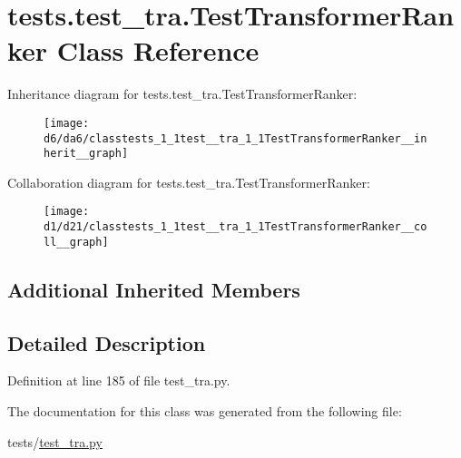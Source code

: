 \hypertarget{classtests_1_1test__tra_1_1TestTransformerRanker}{}\section{tests.\+test\+\_\+tra.\+Test\+Transformer\+Ranker Class Reference}
\label{classtests_1_1test__tra_1_1TestTransformerRanker}


Inheritance diagram for tests.\+test\+\_\+tra.\+Test\+Transformer\+Ranker\+:\nopagebreak
\begin{figure}[H]
\begin{center}
\leavevmode
\texttt{[image: d6/da6/classtests\_1\_1test\_\_tra\_1\_1TestTransformerRanker\_\_inherit\_\_graph]}
\end{center}
\end{figure}


Collaboration diagram for tests.\+test\+\_\+tra.\+Test\+Transformer\+Ranker\+:\nopagebreak
\begin{figure}[H]
\begin{center}
\leavevmode
\texttt{[image: d1/d21/classtests\_1\_1test\_\_tra\_1\_1TestTransformerRanker\_\_coll\_\_graph]}
\end{center}
\end{figure}
\subsection*{Additional Inherited Members}


\subsection{Detailed Description}


Definition at line 185 of file test\+\_\+tra.\+py.



The documentation for this class was generated from the following file\+:\begin{DoxyCompactItemize}
\item 
tests/\hyperlink{test__tra_8py}{test\+\_\+tra.\+py}\end{DoxyCompactItemize}
